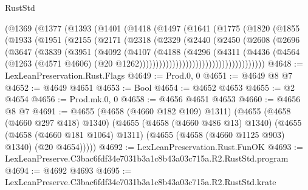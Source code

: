 \begin{lexlean}{RustStd}
\begin{coremodule}
                (@1369
                  (@1377
                    (@1393
                      (@1401
                        (@1418
                          (@1497
                            (@1641
                              (@1775
                                (@1820
                                  (@1855
                                    (@1933
                                      (@1951
                                        (@2155
                                          (@2171
                                            (@2318
                                              (@2329
                                                (@2440
                                                  (@2450
                                                    (@2608
                                                      (@2696
                                                        (@3647
                                                          (@3839
                                                            (@3951
                                                              (@4092
                                                                (@4107
                                                                  (@4188
                                                                    (@4296
                                                                      (@4311
                                                                        (@4436
                                                                          (@4564
                                                                            (@1263
                                                                              (@4571 @4606)
                                                                              (@20
                                                                                @1262))))))))))))))))))))))))))))))))))))))
@4648 := LexLeanPreservation.Rust.Flags
@4649 := Prod.{0, 0}
@4651 := @4649 @8 @7
@4652 := @4649 @4651
@4653 := Bool
@4654 := @4652 @4653
@4655 := @2 @4654
@4656 := Prod.mk.{0, 0}
@4658 := @4656 @4651 @4653
@4660 := @4656 @8 @7
@4691 := @4655
    (@4658 (@4660 @182 @109) @1311)
    (@4655
      (@4658 (@4660 @297 @418) @1340)
      (@4655
        (@4658 (@4660 @486 @13) @1340)
        (@4655
          (@4658 (@4660 @181 @1064) @1311)
          (@4655 (@4658 (@4660 @1125 @903) @1340) (@20 @4654)))))
@4692 := LexLeanPreservation.Rust.FunOK
@4693 := LexLeanPreserve.C3bac6fdf34e7031b3a1c8b43a03c715a.R2.RustStd.program
@4694 := @4692 @4693
@4695 := LexLeanPreserve.C3bac6fdf34e7031b3a1c8b43a03c715a.R2.RustStd.krate

\end{coremodule}
\end{lexlean}
